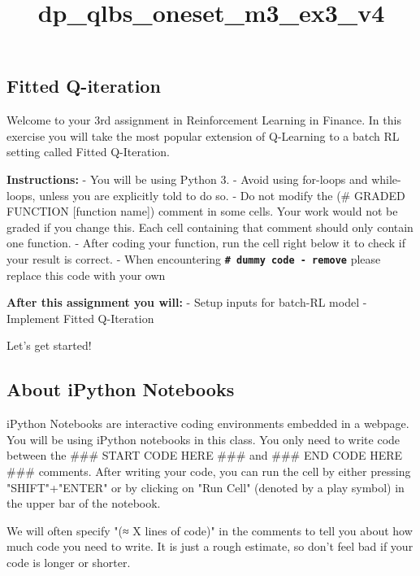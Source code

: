 \documentclass[11pt]{article}
\title{dp\_qlbs\_oneset\_m3\_ex3\_v4}
\begin{document}
    
    
    \maketitle
    
    

    
    \subsection{Fitted Q-iteration}\label{fitted-q-iteration}

Welcome to your 3rd assignment in Reinforcement Learning in Finance. In
this exercise you will take the most popular extension of Q-Learning to
a batch RL setting called Fitted Q-Iteration.

\textbf{Instructions:} - You will be using Python 3. - Avoid using
for-loops and while-loops, unless you are explicitly told to do so. - Do
not modify the (\# GRADED FUNCTION {[}function name{]}) comment in some
cells. Your work would not be graded if you change this. Each cell
containing that comment should only contain one function. - After coding
your function, run the cell right below it to check if your result is
correct. - When encountering
\textbf{\texttt{\#\ dummy\ code\ -\ remove}} please replace this code
with your own

\textbf{After this assignment you will:} - Setup inputs for batch-RL
model - Implement Fitted Q-Iteration

Let's get started!

    \subsection{About iPython Notebooks}\label{about-ipython-notebooks}

iPython Notebooks are interactive coding environments embedded in a
webpage. You will be using iPython notebooks in this class. You only
need to write code between the \#\#\# START CODE HERE \#\#\# and \#\#\#
END CODE HERE \#\#\# comments. After writing your code, you can run the
cell by either pressing "SHIFT"+"ENTER" or by clicking on "Run Cell"
(denoted by a play symbol) in the upper bar of the notebook.

We will often specify "(≈ X lines of code)" in the comments to tell you
about how much code you need to write. It is just a rough estimate, so
don't feel bad if your code is longer or shorter.
\end{document}
